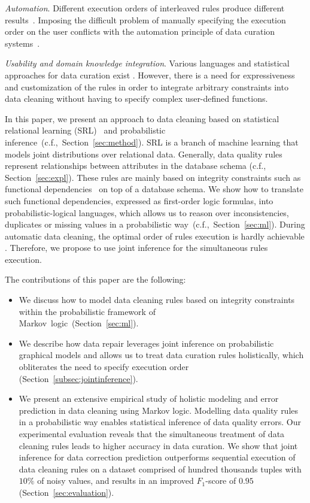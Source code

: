 \textit{Automation}. Different execution orders of interleaved rules produce different results~\cite{Dallachiesa:2013:NCD:2463676.2465327}. Imposing the difficult problem of manually specifying the execution order on the user conflicts with the automation principle of data curation systems~\cite{Stonebraker_datacuration}.

\textit{Usability and domain knowledge integration}. Various languages and statistical approaches for data curation exist \cite{Dallachiesa:2013:NCD:2463676.2465327, chu2013holistic, llunaticVDLB2013b}. However, there is a need for expressiveness and customization of the rules in order to integrate arbitrary constraints into data cleaning without having to specify complex user-defined functions. 

In this paper, we present an approach to data cleaning based on statistical relational learning (SRL)~\cite{getoor2007introduction} and probabilistic inference~(c.f.,~Section~\ref{sec:method}). SRL is a branch of machine learning that models joint distributions over relational data. Generally, data quality rules represent relationships between attributes in the database schema (c.f., Section~\ref{sec:expl}). These rules are mainly based on integrity constraints such as functional dependencies~\cite{AbiteboulHV95, fan2012foundations} on top of a database schema. We show how to translate such functional dependencies, expressed as first-order logic formulas, into probabilistic-logical languages, which allows us to reason over inconsistencies, duplicates or missing values in a probabilistic way~(c.f.,~Section~\ref{sec:ml}). During automatic data cleaning, the optimal order of rules execution is hardly achievable \cite{Dallachiesa:2013:NCD:2463676.2465327}. Therefore, we propose to use joint inference for the simultaneous rules execution.

The contributions of this paper are the following:

\begin{itemize}
  \item We discuss how to model data cleaning rules based on integrity constraints within the probabilistic framework of\\ Markov~logic~(Section~\ref{sec:ml}).
  \item We describe how data repair leverages joint inference on probabilistic graphical models and allows us to treat data curation rules holistically, which obliterates the need to specify execution order (Section~\ref{subsec:jointinference}).\\
 \item We present an extensive empirical study of holistic modeling and error prediction in data cleaning using Markov logic. Modelling data quality rules in a probabilistic way enables statistical inference of data quality errors. Our experimental evaluation reveals that the simultaneous treatment of data cleaning rules leads to higher accuracy in data curation. We show that joint inference for data correction prediction outperforms sequential execution of data cleaning rules on a dataset comprised of hundred thousands tuples with $10\%$ of noisy values, and results in an improved $F_1$-score of $0.95$ (Section~\ref{sec:evaluation}).
\end{itemize}

